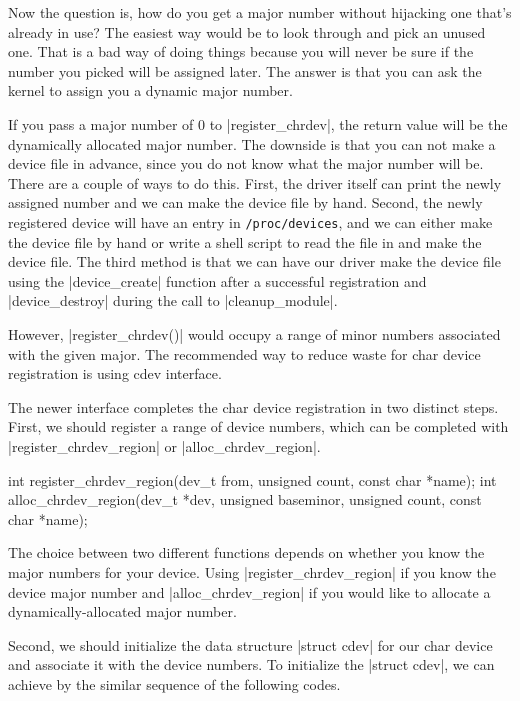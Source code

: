 \documentclass[10pt, oneside]{book}
\begin{document}
Now the question is, how do you get a major number without hijacking one that's already in use?
The easiest way would be to look through  and pick an unused one.
That is a bad way of doing things because you will never be sure if the number you picked will be assigned later.
The answer is that you can ask the kernel to assign you a dynamic major number.

If you pass a major number of 0 to \cpp|register_chrdev|, the return value will be the dynamically allocated major number.
The downside is that you can not make a device file in advance, since you do not know what the major number will be.
There are a couple of ways to do this.
First, the driver itself can print the newly assigned number and we can make the device file by hand.
Second, the newly registered device will have an entry in \verb|/proc/devices|, and we can either make the device file by hand or write a shell script to read the file in and make the device file.
The third method is that we can have our driver make the device file using the \cpp|device_create| function after a successful registration and \cpp|device_destroy| during the call to \cpp|cleanup_module|.

However, \cpp|register_chrdev()| would occupy a range of minor numbers associated with the given major.
The recommended way to reduce waste for char device registration is using cdev interface.

The newer interface completes the char device registration in two distinct steps.
First, we should register a range of device numbers, which can be completed with \cpp|register_chrdev_region| or \cpp|alloc_chrdev_region|.

\begin{code}
int register_chrdev_region(dev_t from, unsigned count, const char *name);
int alloc_chrdev_region(dev_t *dev, unsigned baseminor, unsigned count, const char *name);
\end{code}

The choice between two different functions depends on whether you know the major numbers for your device.
Using \cpp|register_chrdev_region| if you know the device major number and \cpp|alloc_chrdev_region| if you would like to allocate a dynamically-allocated major number.

Second, we should initialize the data structure \cpp|struct cdev| for our char device and associate it with the device numbers.
To initialize the \cpp|struct cdev|, we can achieve by the similar sequence of the following codes.
\end{document}
